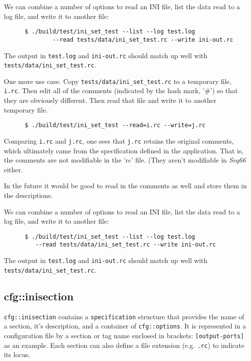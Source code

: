    We can combine a number of options to read an INI file, list the
   data read to a log file, and write it to another file:

   \begin{verbatim}
      $ ./build/test/ini_set_test --list --log test.log
              --read tests/data/ini_set_test.rc --write ini-out.rc
   \end{verbatim}

   The output in \texttt{test.log} and \texttt{ini-out.rc}
   should match up well with \texttt{tests/data/ini\_set\_test.rc}.

   One more use case. Copy \texttt{tests/data/ini\_set\_test.rc}
   to a temporary file, \texttt{i.rc}.
   Then edit all of the comments (indicated by the hash mark, '\#')
   so that they are obviously different.
   Then read that file and write it to another temporary file.

   \begin{verbatim}
      $ ./build/test/ini_set_test --read=i.rc --write=j.rc
   \end{verbatim}

   Comparing \texttt{i.rc} and \texttt{j.rc}, one sees that
   \texttt{j.rc} retains the original comments, which ultimately
   came from the specification defined in the application.
   That is, the comments are not modifiable in the 'rc' file.
   (They aren't modifiable in \textsl{Seq66} either.

   In the future it would be good to read in the comments as well
   and store them in the descriptions.

   We can combine a number of options to read an INI file, list the
   data read to a log file, and write it to another file:

   \begin{verbatim}
      $ ./build/test/ini_set_test --list --log test.log
         --read tests/data/ini_set_test.rc --write ini-out.rc
   \end{verbatim}

   The output in \texttt{test.log} and \texttt{ini-out.rc}
   should match up well with \texttt{tests/data/ini\_set\_test.rc}.

\subsection{cfg::inisection}
\label{subsec:cfg_namespace_inisection}

   \texttt{cfg::inisection}  contains a \texttt{specification} structure that
   provides the name of a section, it's description, and
   a container of \texttt{cfg::options}.
   It is represented in a configuration file by a section or tag name
   enclosed in brackets: \texttt{[output-ports]} as an example.
   Each section can also define a file extension
   (e.g. \texttt{.rc}) to indicate its locus.

